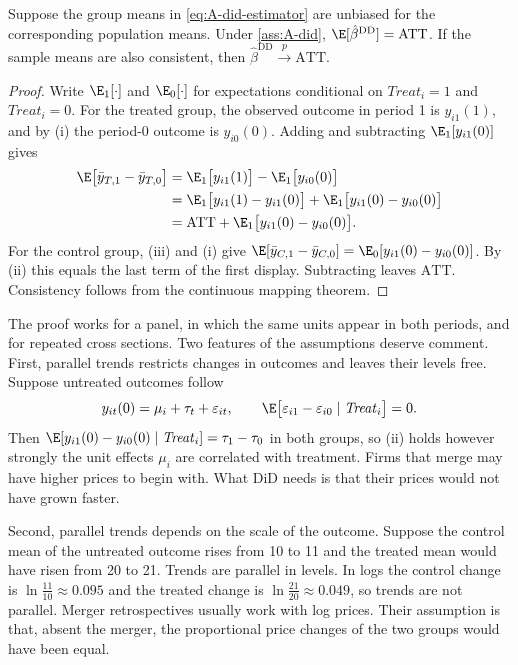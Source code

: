 \begin{proposition}\label{prop:A-did}
Suppose the group means in \eqref{eq:A-did-estimator} are unbiased for the corresponding population means. Under
\cref{ass:A-did}, $\E[\hat\beta^{\mathrm{DD}}]=\mathrm{ATT}$. If the sample means are also consistent, then
$\hat\beta^{\mathrm{DD}}\xrightarrow{p}\mathrm{ATT}$.
\end{proposition}

\begin{proof}
Write $\E_1[\cdot]$ and $\E_0[\cdot]$ for expectations conditional on $\mathit{Treat}_i=1$ and
$\mathit{Treat}_i=0$. For the treated group, the observed outcome in period 1 is $y_{i1}(1)$, and by (i) the
period-0 outcome is $y_{i0}(0)$. Adding and subtracting $\E_1[y_{i1}(0)]$ gives
\begin{align*}
\E\big[\bar y_{T,1}-\bar y_{T,0}\big]
&=\E_1\big[y_{i1}(1)\big]-\E_1\big[y_{i0}(0)\big]\\
&=\E_1\big[y_{i1}(1)-y_{i1}(0)\big]+\E_1\big[y_{i1}(0)-y_{i0}(0)\big]\\
&=\mathrm{ATT}+\E_1\big[y_{i1}(0)-y_{i0}(0)\big].
\end{align*}
For the control group, (iii) and (i) give $\E[\bar y_{C,1}-\bar y_{C,0}]=\E_0[y_{i1}(0)-y_{i0}(0)]$. By (ii)
this equals the last term of the first display. Subtracting leaves $\mathrm{ATT}$. Consistency follows from the
continuous mapping theorem.
\end{proof}

The proof works for a panel, in which the same units appear in both periods, and for repeated cross sections. Two
features of the assumptions deserve comment. First, parallel trends restricts changes in outcomes and leaves their levels free. Suppose
untreated outcomes follow
\begin{equation}\label{eq:A-did-fe-model}
y_{it}(0)=\mu_i+\tau_t+\varepsilon_{it},\qquad \E\big[\varepsilon_{i1}-\varepsilon_{i0}\mid\mathit{Treat}_i\big]=0.
\end{equation}
Then $\E[y_{i1}(0)-y_{i0}(0)\mid\mathit{Treat}_i]=\tau_1-\tau_0$ in both groups, so (ii) holds however strongly the
unit effects $\mu_i$ are correlated with treatment. Firms that merge may have higher prices to begin with. What DiD
needs is that their prices would not have grown faster.

Second, parallel trends depends on the scale of the outcome. Suppose the control mean of the untreated outcome
rises from 10 to 11 and the treated mean would have risen from 20 to 21. Trends are parallel in levels. In logs the
control change is $\ln\frac{11}{10}\approx0.095$ and the treated change is $\ln\frac{21}{20}\approx0.049$, so trends
are not parallel. Merger retrospectives usually work with log prices. Their assumption is that, absent the merger,
the proportional price changes of the two groups would have been equal.

